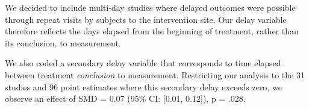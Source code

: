 \documentclass[preprint, 3p,
authoryear]{elsarticle} %
\begin{document}
We decided to include multi-day studies where delayed outcomes were
possible through repeat visits by subjects to the intervention site. Our
delay variable therefore reflects the days elapsed from the beginning of
treatment, rather than its conclusion, to measurement.

We also coded a secondary delay variable that corresponds to time
elapsed between treatment \emph{conclusion} to measurement. Restricting
our analysis to the 31 studies and 96 point estimates where this
secondary delay exceeds zero, we observe an effect of SMD = 0.07 (95\%
CI: {[}0.01, 0.12{]}), p = .028.

\renewcommand\refname{References}

\end{document}
